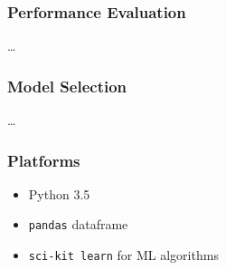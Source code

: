 \documentclass{beamer}
\begin{document}
\frame %
{
  \frametitle{Performance Evaluation}
  \dots
}


\frame %
{
  \frametitle{Model Selection}
  \dots
}

\frame %
{
  \frametitle{Platforms}
  \begin{itemize}
  \item Python 3.5
  \item \texttt{pandas} dataframe
  \item \texttt{sci-kit learn} for ML algorithms
  \end{itemize}
}
\end{document}
